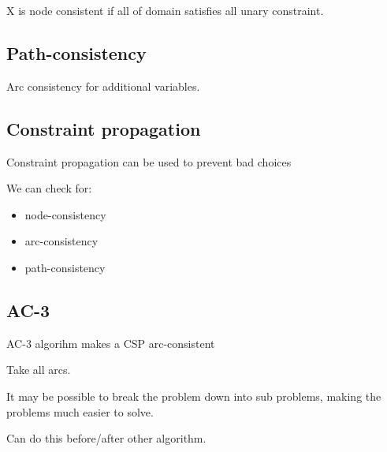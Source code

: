 X is node consistent if all of domain satisfies all unary constraint.

\subsection{Path-consistency}

Arc consistency for additional variables.

\subsection{Constraint propagation}

Constraint propagation can be used to prevent bad choices

We can check for:

\begin{itemize}
\item node-consistency
\item arc-consistency
\item path-consistency
\end{itemize}

\subsection{AC-3}

AC-3 algorihm makes a CSP arc-consistent

Take all arcs.

It may be possible to break the problem down into sub problems, making the problems much easier to solve.

Can do this before/after other algorithm.

